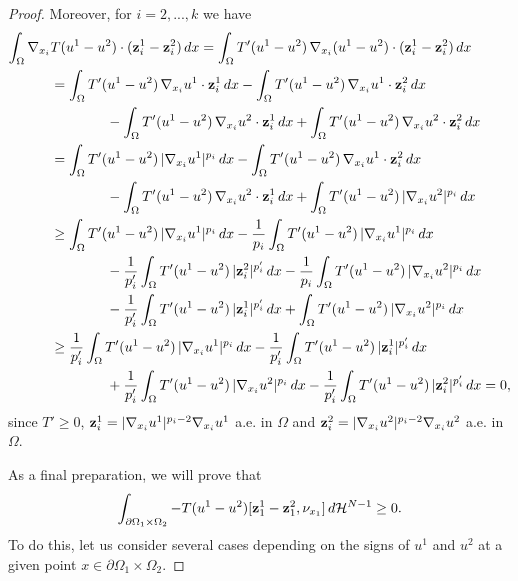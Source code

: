 \documentclass[reqno,12pt]{amsart}
\def\z{{\bf z}}
\numberwithin{equation}{section}
\begin{document}
\begin{proof}
Moreover, for $i = 2,...,k$ we have\begin{align}\label{eq:completeaccretivitymiddleestimate}
\int_{\Omega} \nabla_{x_i} &T(u^1-u^2) \cdot (\z^1_i - \z^2_i) \, dx  =  \int_{\Omega} T'(u^1-u^2) \, \nabla_{x_i} (u^1-u^2) \cdot (\z^1_i - \z^2_i) \, dx \\
&= \int_{\Omega} T'(u^1-u^2) \, \nabla_{x_i} u^1 \cdot \z^1_i \, dx -  \int_{\Omega} T'(u^1-u^2) \, \nabla_{x_i} u^1 \cdot \z^2_i \, dx \\
&\qquad\qquad - \int_{\Omega} T'(u^1-u^2) \, \nabla_{x_i} u^2 \cdot \z^1_i \, dx + \int_{\Omega} T'(u^1-u^2) \, \nabla_{x_i} u^2 \cdot \z^2_i \, dx \\
&= \int_{\Omega} T'(u^1-u^2) \, |\nabla_{x_i} u^1|^{p_i} \, dx -  \int_{\Omega} T'(u^1-u^2) \, \nabla_{x_i} u^1 \cdot \z^2_i \, dx \\
&\qquad\qquad - \int_{\Omega} T'(u^1-u^2) \, \nabla_{x_i} u^2 \cdot \z^1_i \, dx + \int_{\Omega} T'(u^1-u^2) \, |\nabla_{x_i} u^2|^{p_i} \, dx \\
&\geq \int_{\Omega} T'(u^1-u^2) \, |\nabla_{x_i} u^1|^{p_i} \, dx - \frac{1}{p_i} \int_{\Omega} T'(u^1-u^2) \, |\nabla_{x_i} u^1|^{p_i} \, dx \\
&\qquad\qquad  - \frac{1}{p'_i} \int_{\Omega} T'(u^1-u^2) \, \vert \z^2_i \vert^{p'_i} \, dx - \frac{1}{p_i} \int_{\Omega} T'(u^1-u^2) \, |\nabla_{x_i} u^2|^{p_i} \, dx \\
&\qquad\qquad - \frac{1}{p'_i} \int_{\Omega} T'(u^1-u^2) \, \vert \z^1_i \vert^{p'_i} \, dx + \int_{\Omega} T'(u^1-u^2) \, |\nabla_{x_i} u^2|^{p_i} \, dx \\
&\geq \frac{1}{p'_i} \int_{\Omega} T'(u^1-u^2) \, |\nabla_{x_i} u^1|^{p_i} \, dx - \frac{1}{p'_i} \int_{\Omega} T'(u^1-u^2) \, \vert \z^1_i \vert^{p'_i} \, dx \\
&\qquad\qquad + \frac{1}{p'_i} \int_{\Omega} T'(u^1-u^2) \, |\nabla_{x_i} u^2|^{p_i} \, dx - \frac{1}{p'_i} \int_{\Omega} T'(u^1-u^2) \, \vert \z^2_i \vert^{p'_i} \, dx = 0,
\end{align}
since $T' \geq 0$, $\z^1_i = |\nabla_{x_i} u^1|^{p_i-2} \nabla_{x_i} u^1$ a.e. in $\Omega$ and $\z^2_i = |\nabla_{x_i} u^2|^{p_i-2} \nabla_{x_i} u^2$ a.e. in $\Omega$.

As a final preparation, we will prove that
\begin{equation}\label{eq:completeaccretivityfinalestimate}
\int_{\partial\Omega_1 \times \Omega_2} - T(u^1 - u^2) [\z_1^1 - \z_1^2, \nu_{x_1}] \, d\mathcal{H}^{N-1} \geq 0.
\end{equation}
To do this, let us consider several cases depending on the signs of $u^1$ and $u^2$ at a given point $x \in \partial\Omega_1 \times \Omega_2$.


\end{proof}
\end{document}
